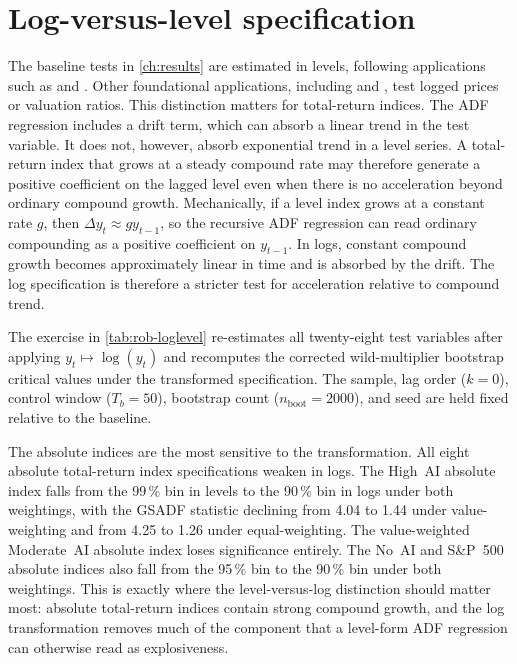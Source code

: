 \section{Log-versus-level specification}
\label{sec:rob-log}

The baseline tests in \cref{ch:results} are estimated in levels, following applications such as \citet{baselePhillipsShi2025} and \citet{caspiPhillipsShi2018}. Other foundational applications, including \citet{phillipsWuYu2011} and \citet{phillipsShiYu2015a}, test logged prices or valuation ratios. This distinction matters for total-return indices. The ADF regression includes a drift term, which can absorb a linear trend in the test variable. It does not, however, absorb exponential trend in a level series. A total-return index that grows at a steady compound rate may therefore generate a positive coefficient on the lagged level even when there is no acceleration beyond ordinary compound growth. Mechanically, if a level index grows at a constant rate $g$, then $\Delta y_t \approx g y_{t-1}$, so the recursive ADF regression can read ordinary compounding as a positive coefficient on $y_{t-1}$. In logs, constant compound growth becomes approximately linear in time and is absorbed by the drift. The log specification is therefore a stricter test for acceleration relative to compound trend.

The exercise in \cref{tab:rob-loglevel} re-estimates all twenty-eight test variables after applying $y_t\mapsto\log(y_t)$ and recomputes the corrected wild-multiplier bootstrap critical values under the transformed specification. The sample, lag order ($k=0$), control window ($T_b=50$), bootstrap count ($n_{\mathrm{boot}}=\num{2000}$), and seed are held fixed relative to the baseline.

The absolute indices are the most sensitive to the transformation. All eight absolute total-return index specifications weaken in logs. The High~AI absolute index falls from the 99\,\% bin in levels to the 90\,\% bin in logs under both weightings, with the GSADF statistic declining from 4.04 to 1.44 under value-weighting and from 4.25 to 1.26 under equal-weighting. The value-weighted Moderate~AI absolute index loses significance entirely. The No~AI and S\&P~500 absolute indices also fall from the 95\,\% bin to the 90\,\% bin under both weightings. This is exactly where the level-versus-log distinction should matter most: absolute total-return indices contain strong compound growth, and the log transformation removes much of the component that a level-form ADF regression can otherwise read as explosiveness.

